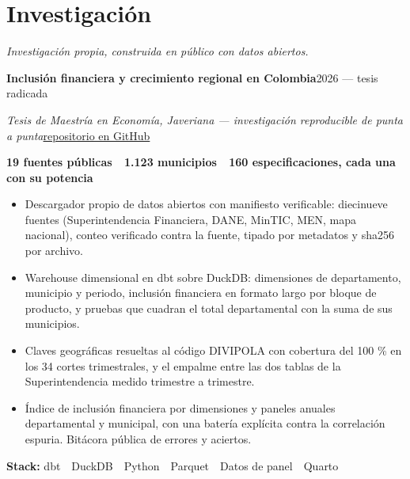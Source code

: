 \documentclass[a4paper,10pt]{article}
\newcommand{\headline}[2]{\needspace{3\baselineskip}\textbf{\color{ink}#1}\hfill{\small #2}\par}
\newcommand{\subline}[2]{\textit{#1}\hfill{\small #2}\par}
\begin{document}
\section*{Investigación}
{\small\itshape Investigación propia, construida en público con datos abiertos.}\par\vspace{3pt}
\headline{Inclusión financiera y crecimiento regional en Colombia}{2026 --- tesis radicada}
\subline{Tesis de Maestría en Economía, Javeriana --- investigación reproducible de punta a punta}{\href{https://github.com/DavinsonR/financial-inclusion-colombia}{repositorio en GitHub}}
{\small\bfseries\color{cold} 19 fuentes públicas \,\textperiodcentered\, 1.123 municipios \,\textperiodcentered\, 160 especificaciones, cada una con su potencia}\par
\begin{itemize}[leftmargin=1.1em, itemsep=0pt, topsep=1pt, parsep=0pt]
  \item Descargador propio de datos abiertos con manifiesto verificable: diecinueve fuentes (Superintendencia Financiera, DANE, MinTIC, MEN, mapa nacional), conteo verificado contra la fuente, tipado por metadatos y sha256 por archivo.
  \item Warehouse dimensional en dbt sobre DuckDB: dimensiones de departamento, municipio y periodo, inclusión financiera en formato largo por bloque de producto, y pruebas que cuadran el total departamental con la suma de sus municipios.
  \item Claves geográficas resueltas al código DIVIPOLA con cobertura del 100 \% en los 34 cortes trimestrales, y el empalme entre las dos tablas de la Superintendencia medido trimestre a trimestre.
  \item Índice de inclusión financiera por dimensiones y paneles anuales departamental y municipal, con una batería explícita contra la correlación espuria. Bitácora pública de errores y aciertos.
\end{itemize}
{\small\textbf{Stack:} dbt \,\textperiodcentered\, DuckDB \,\textperiodcentered\, Python \,\textperiodcentered\, Parquet \,\textperiodcentered\, Datos de panel \,\textperiodcentered\, Quarto}\par
\vspace{4pt}
\end{document}
